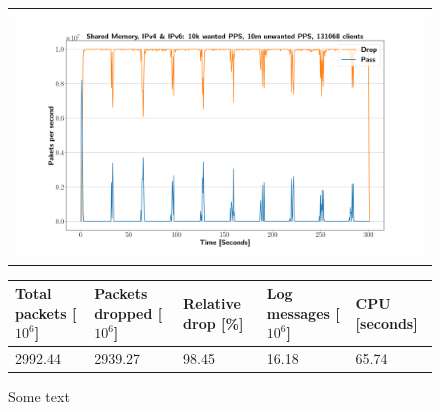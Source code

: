 \begin{figure}[p]
	\label{fig:simplefail2ban:shm:ip46:10m}
	\centering
	\scriptsize
	\begin{tabular}{c}
    	\centerline{\includegraphics[width=1.2\textwidth]{images/simplefail2ban_shm_ipv46_v10k_iv10m_c131068.png}}
	\end{tabular}
	\begin{tabular}{lllll}
		\toprule
		\textbf{Total packets [$10^6$]} & \textbf{Packets dropped [$10^6$]} & \textbf{Relative drop [\%]} & \textbf{Log messages [$10^6$]} & \textbf{CPU [seconds]} \\ \midrule 
		2992.44 & 2939.27 & 98.45 & 16.18 & 65.74 \\
		\bottomrule
	\end{tabular}
	\caption[Simplefail2ban, Shared Memory, IPv4 \& IPv6, 10m \ac{PPS}]{Some text}
\end{figure}

